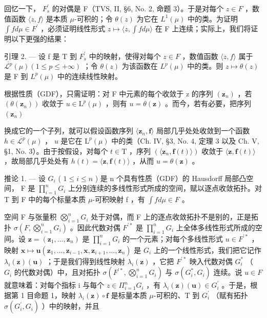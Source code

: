 回忆一下， \(F_{s}^{\prime}\) 的对偶是 F（TVS, II, §6, No. 2, 命题 3）。于是对每个 \(z \in F\) ，数值函数 \(\langle z, f \rangle\) 是本质 \(\mu\)-可积的；令 \(\theta(z)\) 为它在 \(L^{1}(\mu)\) 中的类。为证明 \(\int f d\mu \in F^{\prime}\) ，必须证明线性形式 \(z \mapsto \langle z, \int f d\mu \rangle\) 在 F 上连续；实际上，我们将证明以下更强的结果：

引理 2. --- 设 f 是 T 到 \(F_{s}^{\prime}\) 中的映射，使得对每个 \(z \in F\) ，数值函数 \(\langle z, f \rangle\) 属于 \(\overline{\mathcal{L}^{p}}(\mu) (1 \leqslant p \leqslant +\infty)\) ；令 \(\theta(z)\) 为该函数在 \(L^{p}(\mu)\) 中的类。则 \(z \mapsto \theta(z)\) 是 F 到 \(L^{p}(\mu)\) 中的连续线性映射。

根据性质（GDF），只需证明：对 F 中元素的每个收敛于 z 的序列 \((\mathbf{z}_{n})\) ，若 \((\theta(\mathbf{z}_{n}))\) 收敛于 \(u \in \mathrm{L}^{p}(\mu)\) ，则有 \(u = \theta(\mathbf{z})\) 。而今，若有必要，把序列 \((\mathbf{z}_{n})\)

换成它的一个子列，就可以假设函数序列 \(\langle \mathbf{z}_n,\mathbf{f}\rangle\) 局部几乎处处收敛到一个函数 \(h\in \overline{\mathcal{L}^p} (\mu)\) ， \(u\) 是它在 \(\mathrm{L}^p (\mu)\) 中的类（Ch. IV, §3, No. 4, 定理 3 以及 Ch. V, §1, No. 3）。由于按假设，对每个 \(t\in \mathrm{T}\) ，序列 \((\langle \mathbf{z}_n,\mathbf{f}(t)\rangle)\) 收敛于 \(\langle \mathbf{z},\mathbf{f}(t)\rangle\) ，故局部几乎处处有 \(h(t) = \langle \mathbf{z},\mathbf{f}(t)\rangle\) ，从而 \(u = \theta (\mathbf{z})\) 。

推论 1. --- 设 \(G_{i}\) ( \(1 \leqslant i \leqslant n\) ) 是 n 个具有性质（GDF）的 Hausdorff 局部凸空间， F 是 \(\prod_{i=1}^{n} G_{i}\) 上分别连续的多线性形式所成的空间，赋以逐点收敛拓扑。对 T 到 F 中的每个标量本质 \(\mu\)-可积映射 f ，有 \(\int f d\mu \in F\) 。

空间 F 与张量积 \(\bigotimes_{i=1}^{n}G_{i}\) 处于对偶，而 F 上的逐点收敛拓扑不是别的，正是拓扑 \(\sigma(F,\bigotimes_{i=1}^{n}G_{i})\) 。因此代数对偶 \(F^{\prime*}\) 是 \(\prod_{i=1}^{n}G_{i}\) 上全体多线性形式所成的空间。设 \(\mathbf{z}=(\mathbf{z}_{1},\ldots,\mathbf{z}_{n})\) 是 \(\prod_{i=1}^{n}G_{i}\) 的一个元素；对每个多线性形式 \(u\in F^{\prime*}\) ，映射 \(\mathbf{x}\mapsto\mathbf{u}(\mathbf{z}_{1},\ldots,\mathbf{z}_{i-1},\mathbf{x},\mathbf{z}_{i+1},\ldots,\mathbf{z}_{n})\) 是 \(G_{i}\) 上的一个线性形式，我们把它记作 \(\lambda_{i}(\mathbf{z})(\mathbf{u})\) ；于是我们得到线性映射 \(\lambda_{i}(\mathbf{z})\) ，它把 \(F^{\prime*}\) 映入代数对偶 \(G_{i}^{*}\) （ \(G_{i}\) 的代数对偶）中，且对拓扑 \(\sigma(F^{\prime*},\bigotimes_{i=1}^{n}G_{i})\) 与 \(\sigma(G_{i}^{*},G_{i})\) 连续。说 \(u\in F\) 就意味着：对每个指标 i 与每个 \(z\in\Pi_{i=1}^{n}G_{i}\) ，有 \(\lambda_{i}(\mathbf{z})(\mathbf{u})\in G_{i}^{\prime}\) 。于是，根据第 1 目命题 1，映射 \(\lambda_{i}(\mathbf{z})\circ\mathbf{f}\) 是标量本质 \(\mu\)-可积的、T 到 \(G_{i}^{\prime}\) （赋有拓扑 \(\sigma(G_{i}^{\prime},G_{i})\) ）中的映射，并且

